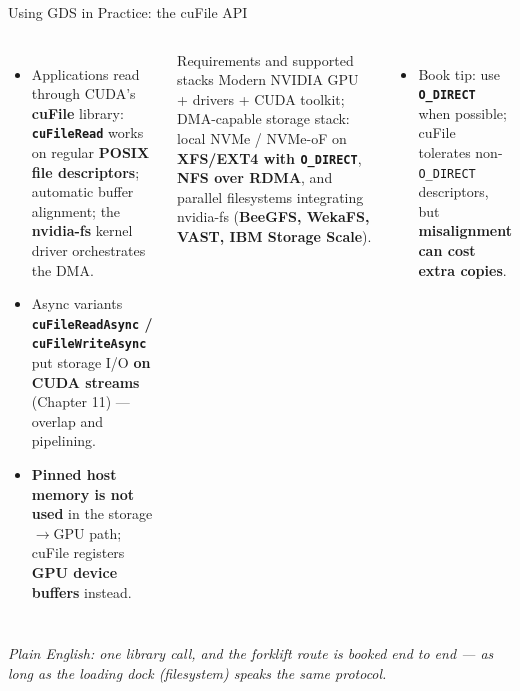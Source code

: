 \documentclass[aspectratio=169]{beamer}
\newcommand{\kw}[1]{\textbf{\textcolor{kwblue}{#1}}}
\newcommand{\pe}[1]{\par{\setlength{\fboxsep}{2.5pt}\noindent\colorbox{navy!9}{\parbox{\dimexpr\textwidth-5pt\relax}{\footnotesize\itshape Plain English: #1}}}}
\begin{document}
\begin{frame}{Using GDS in Practice: the cuFile API}
  \begin{columns}[t]
    \begin{itemize}\small
      \item Applications read through CUDA's \kw{cuFile} library: \kw{\texttt{cuFileRead}}
            works on regular \kw{POSIX file descriptors}; automatic buffer alignment;
            the \kw{nvidia-fs} kernel driver orchestrates the DMA.
      \item Async variants \kw{\texttt{cuFileReadAsync} / \texttt{cuFileWriteAsync}} put storage
            I/O \kw{on CUDA streams} (Chapter 11) --- overlap and pipelining.
      \item \kw{Pinned host memory is not used} in the storage$\to$GPU path; cuFile registers
            \kw{GPU device buffers} instead.
    \end{itemize}
    \begin{block}{Requirements and supported stacks}
      \small Modern NVIDIA GPU + drivers + CUDA toolkit; DMA-capable storage stack:
      local NVMe / NVMe-oF on \kw{XFS/EXT4 with \texttt{O\_DIRECT}}, \kw{NFS over RDMA},
      and parallel filesystems integrating nvidia-fs (\kw{BeeGFS, WekaFS, VAST, IBM Storage Scale}).
    \end{block}
    \begin{itemize}\small
      \item Book tip: use \kw{\texttt{O\_DIRECT}} when possible; cuFile tolerates non-\texttt{O\_DIRECT}
            descriptors, but \kw{misalignment can cost extra copies}.
    \end{itemize}
  \end{columns}
  \pe{one library call, and the forklift route is booked end to end --- as long as the loading dock (filesystem) speaks the same protocol.}
\end{frame}
\end{document}
